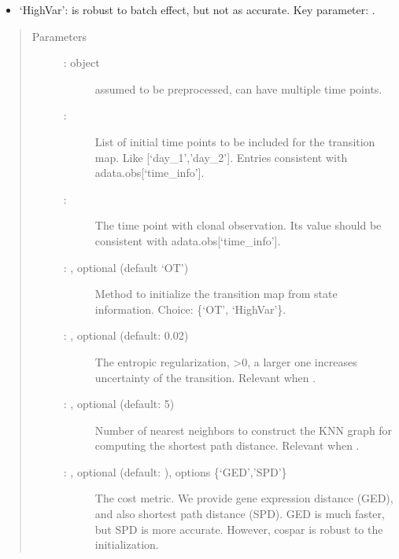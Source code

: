 \documentclass[letterpaper,10pt,english]{sphinxmanual}
\begin{document}
\begin{fulllineitems}
\begin{itemize}
\item {} 
‘HighVar’:  is robust to batch effect, but not as accurate.
Key parameter: .

\end{itemize}
\begin{quote}\begin{description}
\item[{Parameters}] \leavevmode\begin{description}
\item[{ :  object}] \leavevmode
assumed to be preprocessed, can have multiple time points.

\item[{ : }] \leavevmode
List of initial time points to be included for the transition map.
Like {[}‘day\_1’,’day\_2’{]}. Entries consistent with adata.obs{[}‘time\_info’{]}.

\item[{ : }] \leavevmode
The time point with clonal observation. Its value should be
consistent with adata.obs{[}‘time\_info’{]}.

\item[{ : , optional (default ‘OT’)}] \leavevmode
Method to initialize the transition map from state information.
Choice: \{‘OT’, ‘HighVar’\}.

\item[{ : , optional (default: 0.02)}] \leavevmode
The entropic regularization, \textgreater{}0, a larger one increases
uncertainty of the transition. Relevant when .

\item[{ : , optional (default: 5)}] \leavevmode
Number of nearest neighbors to construct the KNN graph for
computing the shortest path distance. Relevant when .

\item[{ : , optional (default: ), options \{‘GED’,’SPD’\}}] \leavevmode
The cost metric. We provide gene expression distance (GED), and also
shortest path distance (SPD). GED is much faster, but SPD is more accurate.
However, cospar is robust to the initialization.


\end{description}
\end{description}
\end{quote}
\end{fulllineitems}
\end{document}
